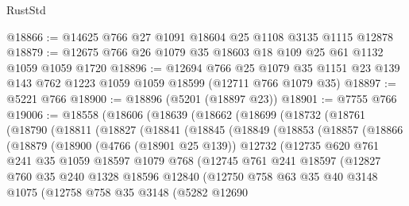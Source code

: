 \begin{lexlean}{RustStd}
\begin{coremodule}
@18866 := @14625 @766 @27 @1091 @18604 @25 @1108 @3135 @1115 @12878
@18879 := @12675 @766 @26 @1079 @35 @18603 @18 @109 @25 @61 @1132 @1059 @1059 @1720
@18896 := @12694
    @766
    @25
    @1079
    @35
    @1151
    @23
    @139
    @143
    @762
    @1223
    @1059
    @1059
    @18599
    (@12711 @766 @1079 @35)
@18897 := @5221 @766
@18900 := @18896 (@5201 (@18897 @23))
@18901 := @7755 @766
@19006 := @18558
    (@18606
      (@18639
        (@18662
          (@18699
            (@18732
              (@18761
                (@18790
                  (@18811
                    (@18827
                      (@18841
                        (@18845
                          (@18849
                            (@18853
                              (@18857
                                (@18866
                                  (@18879
                                    (@18900
                                      (@4766 (@18901 @25 @139))
                                      @12732
                                      (@12735
                                        @620
                                        @761
                                        @241
                                        @35
                                        @1059
                                        @18597
                                        @1079
                                        @768
                                        (@12745
                                          @761
                                          @241
                                          @18597
                                          (@12827
                                            @760
                                            @35
                                            @240
                                            @1328
                                            @18596
                                            @12840
                                            (@12750
                                              @758
                                              @63
                                              @35
                                              @40
                                              @3148
                                              @1075
                                              (@12758
                                                @758
                                                @35
                                                @3148
                                                (@5282
                                                  @12690

\end{coremodule}
\end{lexlean}
